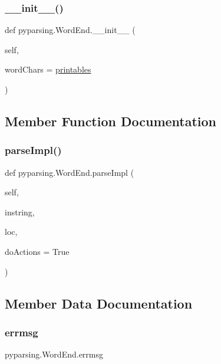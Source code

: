 \subsubsection{\texorpdfstring{\+\_\+\+\_\+init\+\_\+\+\_\+()}{\_\_init\_\_()}}
{\footnotesize\ttfamily def pyparsing.\+Word\+End.\+\_\+\+\_\+init\+\_\+\+\_\+ (\begin{DoxyParamCaption}\item[{}]{self,  }\item[{}]{word\+Chars = {\ttfamily \hyperlink{namespacepyparsing_ad8c4f09cc517099e759be4c94403f9b4}{printables}} }\end{DoxyParamCaption})}



\subsection{Member Function Documentation}
\mbox{\label{classpyparsing_1_1WordEnd_a1bf77087de10cf32ae3837a0758d166c}} 
\subsubsection{\texorpdfstring{parse\+Impl()}{parseImpl()}}
{\footnotesize\ttfamily def pyparsing.\+Word\+End.\+parse\+Impl (\begin{DoxyParamCaption}\item[{}]{self,  }\item[{}]{instring,  }\item[{}]{loc,  }\item[{}]{do\+Actions = {\ttfamily True} }\end{DoxyParamCaption})}



\subsection{Member Data Documentation}
\mbox{\label{classpyparsing_1_1WordEnd_ab6fd7454a05f4dacd080f5301b7a9e99}} 
\subsubsection{\texorpdfstring{errmsg}{errmsg}}
{\footnotesize\ttfamily pyparsing.\+Word\+End.\+errmsg}

